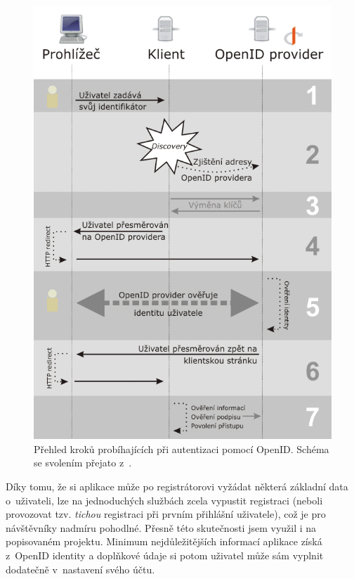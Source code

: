 \begin{figure}[p]
	\includegraphics[width=\textwidth, keepaspectratio]{fig/openid}
	\caption{Přehled kroků probíhajících při autentizaci pomocí OpenID.
	Schéma se svolením přejato z~\cite{openid}.}
	\label{obrOpenId}
\end{figure}

Díky tomu, že si aplikace může po registrátorovi vyžádat některá
základní data o~uživateli, lze na jednoduchých službách zcela
vypustit registraci (neboli provozovat tzv. {\it tichou} registraci
při prvním přihlášní uživatele), což je pro návštěvníky nadmíru
pohodlné. Přesně této skutečnosti jsem využil i na popisovaném
projektu. Minimum nej\-důležitějších informací aplikace získá z~OpenID
identity a doplňkové údaje si potom uživatel může sám vyplnit
dodatečně v~nastavení svého účtu.

